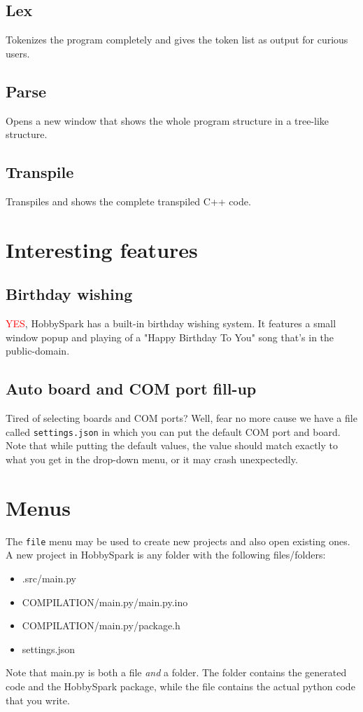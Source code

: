 \subsection{Lex}
Tokenizes the program completely and gives the token list as output for curious users.
\subsection{Parse}
Opens a new window that shows the whole program structure in a tree-like structure.
\subsection{Transpile}
Transpiles and shows the complete transpiled C++ code.

\section{Interesting features}
\subsection{Birthday wishing}
\textcolor{red}{YES}, HobbySpark has a built-in birthday wishing system. It features a small window popup and playing of a "Happy Birthday To You" song that's in the public-domain.
\subsection{Auto board and COM port fill-up}
Tired of selecting boards and COM ports? Well, fear no more cause we have a file called \texttt{settings.json} in which you can put the default COM port and board. Note that while putting the default values, the value should match exactly to what you get in the drop-down menu, or it may crash unexpectedly.

\section{Menus}
The \texttt{file} menu may be used to create new projects and also open existing ones. A new project in HobbySpark is any folder with the following files/folders:
\begin{itemize}
	\item .src/main.py
	\item COMPILATION/main.py/main.py.ino
	\item COMPILATION/main.py/package.h
	\item settings.json
\end{itemize}
Note that main.py is both a file \emph{and} a folder. The folder contains the generated code and the HobbySpark package, while the file contains the actual python code that you write.


